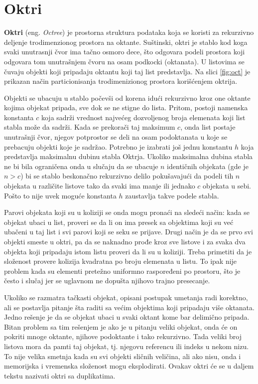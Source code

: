 \documentclass[12pt,oneside]{memoir}
\begin{document}
\section{Oktri}
\label{subsec:octree}

\textbf{Oktri} (eng. {\em Octree}) je prostorna struktura podataka koja se koristi za rekurzivno deljenje trodimenzionog prostora na oktante.
Suštinski, oktri je stablo kod koga svaki unutrasnji čvor ima tačno osmoro dece,
što odgovara podeli prostora koji odgovara tom unutrašnjem čvoru na osam podkocki (oktanata).
U listovima se čuvaju objekti koji pripadaju oktantu koji taj list predstavlja.
Na slici \ref{fig:oct} je prikazan način particionisanja trodimenizionog prostora korišćenjem oktrija.

Objekti se ubacuju u stablo počevši od korena idući rekurzivno kroz one oktante kojima objekat pripada,
sve dok se ne stigne do lista.
Pritom, postoji namenska konstanta $c$ koja sadrži vrednost najvećeg dozvoljenog broja elemenata koji list stabla može da sadrži.
Kada se prekorači taj maksimum $c$, onda list postaje unutrašnji čvor, njegov potprostor se deli 
na osam podoktanata u koje se prebacuju objekti koje je sadržao.
Potrebno je izabrati još jednu konstantu $h$ koja predstavlja maksimalnu dubinu stabla Oktrja.
Ukoliko maksimalna dubina stabla ne bi bila ograničena onda u slučaju da se ubacuje $n$ identičnih objekata (gde je $n > c$) bi se stablo 
beskonačno rekurzivno delilo pokušavajući da podeli tih $n$ objekata u različite listove 
tako da svaki ima manje ili jednako $c$ objekata u sebi. 
Pošto to nije uvek moguće konstanta $h$ zaustavlja takve podele stabla.

Parovi objekata koji su u koliziji se onda mogu pronaći na sledeći način:
kada se objekat ubaci u list, proveri se da li on ima presek sa objektima koji su već
ubačeni u taj list i svi parovi koji se seku se prijave.
Drugi način je da se prvo svi objekti smeste u oktri, 
pa da se naknadno prođe kroz sve listove i za svaka dva objekta koji pripadaju istom listu proveri da li su u koliziji.
Treba primetiti da je složenost provere kolizija kvadratna po broju elemenata u listu.
To ipak nije problem kada su elementi pretežno uniformno raspoređeni po prostoru, što je često 
i slučaj jer se uglavnom ne dopušta njihovo trajno presecanje. 

Ukoliko se razmatra tačkasti objekat, opisani postupak umetanja radi korektno,
ali se postavlja pitanje šta raditi sa većim objektima koji pripadaju više oktanata.
Jedno rešenje je da se objekat ubaci u svaki oktant kome bar delimično pripada.
Bitan problem sa tim rešenjem je ako je u pitanju veliki objekat, onda će on pokriti mnoge oktante, njihove 
podoktante i tako rekurzivno. 
Tada veliki broj listova mora da pamti taj objekat, tj. njegovu referencu ili indeks u nekom nizu.
To nije velika smetnja kada su svi objekti sličnih veličina, ali ako 
nisu, onda i memorijska i vremenska složenost mogu eksplodirati.
Ovakav oktri će se u daljem tekstu nazivati oktri sa duplikatima.
\end{document}

